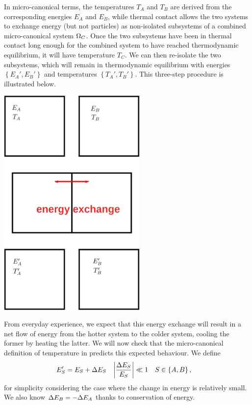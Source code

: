 In micro-canonical terms, the temperatures $T_A$ and $T_B$ are derived from the corresponding energies $E_A$ and $E_B$, while thermal contact allows the two systems to exchange energy (but not particles) as non-isolated subsystems of a combined micro-canonical system $\Omega_C$.
Once the two subsystems have been in thermal contact long enough for the combined system to have reached thermodynamic equilibrium, it will have temperature $T_C$.
We can then re-isolate the two subsystems, which will remain in thermodynamic equilibrium with energies $\left\{E_A', E_B'\right\}$ and temperatures $\left\{T_A', T_B'\right\}$.
This three-step procedure is illustrated below.

\begin{center} %
  \includegraphics[width=0.55\textwidth]{figs/unit02_heat-exchange.pdf}
\end{center}

From everyday experience, we expect that this energy exchange will result in a net flow of energy from the hotter system to the colder system, cooling the former by heating the latter.
We will now check that the micro-canonical definition of temperature in  predicts this expected behaviour.
We define
\begin{align*}
  E_S' & = E_S + \Delta E_S &
  \left|\frac{\Delta E_S}{E_S}\right| & \ll 1 &
  S & \in \left\{A, B\right\},
\end{align*}
for simplicity considering the case where the change in energy is relatively small. %
We also know $\Delta E_B = -\Delta E_A$ thanks to conservation of energy.

